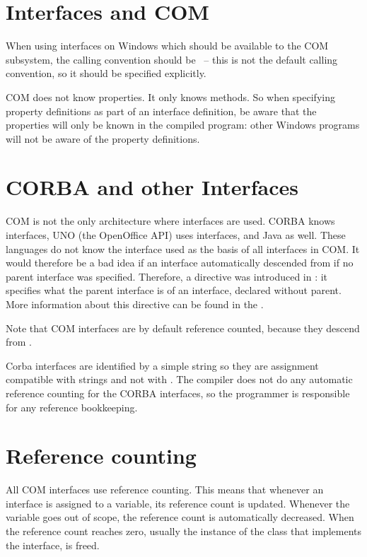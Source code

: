 \section{Interfaces and COM}
When using interfaces on Windows which should be available to the COM
subsystem, the calling convention should be ~-- this is not the
default \fpc calling convention, so it should be specified explicitly.

COM does not know properties. It only knows methods. So when specifying
property definitions as part of an interface definition, be aware that the
properties will only be known in the \fpc compiled program: other Windows
programs will not be aware of the property definitions.

\section{CORBA and other Interfaces}
COM is not the only architecture where interfaces are used. CORBA knows
interfaces, UNO (the OpenOffice API) uses interfaces, and Java as well.
These languages do not know the  interface used as the basis of
all interfaces in COM. It would therefore be a bad idea if an interface
automatically descended from  if no parent interface was
specified. Therefore, a directive  was introduced in
 \fpc: it specifies what the parent interface is of an interface, declared
without parent. More information about this directive can be found in the
\progref.

Note that COM interfaces are by default reference counted, because they
descend from .

Corba interfaces are identified by a simple string so they are assignment
compatible with strings and not with . The compiler does not do
any automatic reference counting for the CORBA interfaces, so the programmer
is responsible for any reference bookkeeping.

\section{Reference counting}
All COM interfaces use reference counting.  This means that whenever an
interface is assigned to a variable, its reference count is updated.
Whenever the variable goes out of scope, the reference count is
automatically decreased. When the reference count reaches zero, usually the
instance of the class that implements the interface, is freed.

